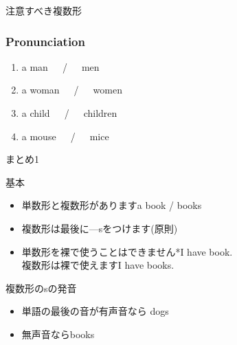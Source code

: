 \documentclass[aspectratio=169,xcolor={dvipsnames,table}]{beamer}
\newcommand{\myaudio}[1]{\href{#1}{\faVolumeUp}}
\begin{document}
\begin{frame}[plain]{注意すべき複数形}
 \pause\hspace{190pt}{\LARGE a mouse}%
\pause{}


\bigskip

\bigskip

\pause{}%
\pause{}


\bigskip

\bigskip

\mbox{}\hfill\myaudio{./audio/005_singular_plural_11.mp3}
\end{frame}
\begin{frame}[plain]\frametitle{Pronunciation}

\begin{enumerate}
 \item a man~~~\pause{}/~~~men\pause
 \item a woman~~~\pause{}/~~~women\pause
 \item a child~~~\pause{}/~~~children\pause
 \item a mouse~~~\pause{}/~~~mice
  \end{enumerate}
\pause

\bigskip

\bigskip

\mbox{}\hfill\myaudio{./audio/005_singular_plural_12.mp3}
\end{frame}
\begin{frame}[plain]{まとめ1}
 \begin{block}{基本}\small
\begin{itemize}
 \item  単数形と複数形があります\hfill{}a book / books
 \item 複数形は最後に---sをつけます(原則)
 \item  単数形を裸で使うことはできません\hfill{}*I have book.\,\,\dbend\\
複数形は裸で使えます\hfill{}I have books.\,\phantom{\dbend}\mbox{}
\end{itemize}
      \end{block}

\pause

\begin{block}{複数形のsの発音}\small
\begin{itemize}
 \item 単語の最後の音が有声音なら\,\,\dbend\hfill{}dogs 
 \item \phantom{単語の最後の音が}無声音なら\hfill{}books 
\end{itemize}
\end{block}
\end{frame}
\end{document}
